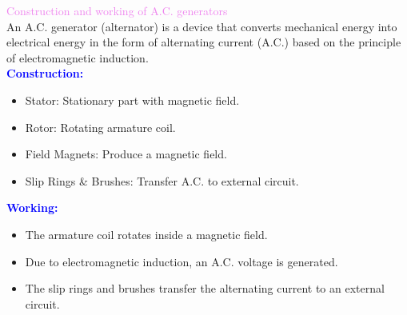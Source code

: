 \documentclass{beamer}
\begin{document}
\begin{frame}
\textcolor{violet}{Construction and working of
A.C. generators}\\
An A.C. generator (alternator) is a device that converts mechanical energy into electrical energy in the form of alternating current (A.C.) based on the principle of electromagnetic induction.\\
\textcolor{blue}{\textbf{Construction:}}
\begin{itemize}
\item Stator: Stationary part with magnetic field.
\item Rotor: Rotating armature coil.
\item Field Magnets: Produce a magnetic field.
\item Slip Rings & Brushes: Transfer A.C. to external circuit.
\end{itemize}
\textcolor{blue}{\textbf{Working:}}
\begin{itemize}
\item The armature coil rotates inside a magnetic field.
\item Due to electromagnetic induction, an A.C. voltage is generated.
\item The slip rings and brushes transfer the alternating current to an external circuit.
\end{itemize}

\end{frame}

\end{document}
